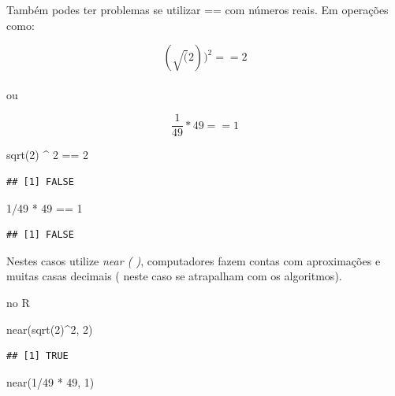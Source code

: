 \documentclass[
]{article}
\newenvironment{Shaded}{\begin{snugshade}}{\end{snugshade}}
\newcommand{\DecValTok}[1]{\textcolor[rgb]{0.00,0.00,0.81}{#1}}
\newcommand{\FunctionTok}[1]{\textcolor[rgb]{0.00,0.00,0.00}{#1}}
\newcommand{\NormalTok}[1]{#1}
\newcommand{\SpecialCharTok}[1]{\textcolor[rgb]{0.00,0.00,0.00}{#1}}
\begin{document}
Também podes ter problemas se utilizar == com números reais. Em
operações como:

\[(\sqrt(2))^2==2\]\\
ou

\[ \frac{1}{49}*49==1\]

\begin{Shaded}
\begin{Highlighting}[]
\FunctionTok{sqrt}\NormalTok{(}\DecValTok{2}\NormalTok{) }\SpecialCharTok{\^{}} \DecValTok{2} \SpecialCharTok{==} \DecValTok{2}
\end{Highlighting}
\end{Shaded}

\begin{verbatim}
## [1] FALSE
\end{verbatim}

\begin{Shaded}
\begin{Highlighting}[]
\DecValTok{1}\SpecialCharTok{/}\DecValTok{49} \SpecialCharTok{*} \DecValTok{49} \SpecialCharTok{==} \DecValTok{1}
\end{Highlighting}
\end{Shaded}

\begin{verbatim}
## [1] FALSE
\end{verbatim}

Nestes casos utilize \emph{near ( )}, computadores fazem contas com
aproximações e muitas casas decimais ( neste caso se atrapalham com os
algoritmos).

no R

\begin{Shaded}
\begin{Highlighting}[]
\FunctionTok{near}\NormalTok{(}\FunctionTok{sqrt}\NormalTok{(}\DecValTok{2}\NormalTok{)}\SpecialCharTok{\^{}}\DecValTok{2}\NormalTok{, }\DecValTok{2}\NormalTok{)}
\end{Highlighting}
\end{Shaded}

\begin{verbatim}
## [1] TRUE
\end{verbatim}

\begin{Shaded}
\begin{Highlighting}[]
\FunctionTok{near}\NormalTok{(}\DecValTok{1}\SpecialCharTok{/}\DecValTok{49} \SpecialCharTok{*} \DecValTok{49}\NormalTok{, }\DecValTok{1}\NormalTok{)}
\end{Highlighting}
\end{Shaded}
\end{document}
